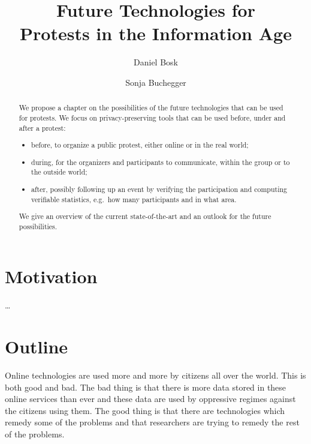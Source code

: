 \documentclass[a4paper]{llncs}
\title{%
  Future Technologies for\\
  Protests in the Information Age
}
\author{%
  Daniel Bosk
  \and
  Sonja Buchegger
}
\institute{%
  School of Computer Science and Communication,\\
  KTH Royal Institute of Technology,
  Stockholm\\
  \email{\{dbosk,buc\}@kth.se}
}
\begin{document}
\maketitle

\begin{abstract}
  We propose a chapter on the possibilities of the future technologies that can 
  be used for protests.
  We focus on privacy-preserving tools that can be used before, under and after 
  a protest:
  \begin{itemize}
    \item before, to organize a public protest, either online or in the real 
      world;
    \item during, for the organizers and participants to communicate, within 
      the group or to the outside world;
    \item after, possibly following up an event by verifying the participation 
      and computing verifiable statistics, e.g.\ how many participants and in 
      what area.
  \end{itemize}
  We give an overview of the current state-of-the-art and an outlook for the 
  future possibilities.
\end{abstract}


\section{Motivation}
\dots


\section{Outline}

Online technologies are used more and more by citizens all over the world.
This is both good and bad.
The bad thing is that there is more data stored in these online services than 
ever and these data are used by oppressive regimes against the citizens using 
them.
The good thing is that there are technologies which remedy some of the problems 
and that researchers are trying to remedy the rest of the problems.
\end{document}
